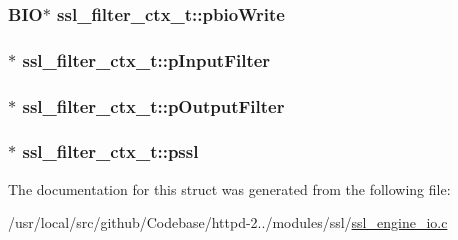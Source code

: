 \subsubsection[{\texorpdfstring{pbio\+Write}{pbioWrite}}]{\setlength{\rightskip}{0pt plus 5cm}B\+IO$\ast$ ssl\+\_\+filter\+\_\+ctx\+\_\+t\+::pbio\+Write}\hypertarget{structssl__filter__ctx__t_a4e449f415486ddfd7479a71b72eaca2e}{}\label{structssl__filter__ctx__t_a4e449f415486ddfd7479a71b72eaca2e}
\subsubsection[{\texorpdfstring{p\+Input\+Filter}{pInputFilter}}]{$\ast$ ssl\+\_\+filter\+\_\+ctx\+\_\+t\+::p\+Input\+Filter}\hypertarget{structssl__filter__ctx__t_a80848b379ca25077a682ef33e50e663d}{}\label{structssl__filter__ctx__t_a80848b379ca25077a682ef33e50e663d}
\subsubsection[{\texorpdfstring{p\+Output\+Filter}{pOutputFilter}}]{$\ast$ ssl\+\_\+filter\+\_\+ctx\+\_\+t\+::p\+Output\+Filter}\hypertarget{structssl__filter__ctx__t_acc7e53b50f69ac29a017ed7f4c336691}{}\label{structssl__filter__ctx__t_acc7e53b50f69ac29a017ed7f4c336691}
\subsubsection[{\texorpdfstring{pssl}{pssl}}]{$\ast$ ssl\+\_\+filter\+\_\+ctx\+\_\+t\+::pssl}\hypertarget{structssl__filter__ctx__t_a790a9309cae82f7be6727d3bbae4bcbf}{}\label{structssl__filter__ctx__t_a790a9309cae82f7be6727d3bbae4bcbf}


The documentation for this struct was generated from the following file\+:\begin{DoxyCompactItemize}
\item 
/usr/local/src/github/\+Codebase/httpd-\/2../modules/ssl/\hyperlink{ssl__engine__io_8c}{ssl\+\_\+engine\+\_\+io.\+c}\end{DoxyCompactItemize}
